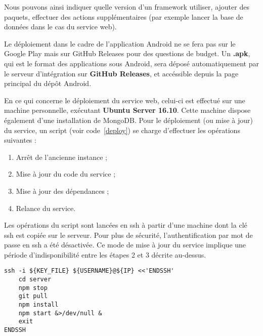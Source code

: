 Nous pouvons ainsi indiquer quelle version d'un framework utiliser, ajouter des paquets, effectuer des actions supplémentaires (par exemple lancer la base de données dans le cas du service web).

Le déploiement dans le cadre de l’application Android ne se fera pas sur le Google Play mais sur GitHub Releases pour des questions de budget. Un \textbf{.apk}, qui est le format des applications sous Android, sera déposé automatiquement par le serveur d’intégration sur \textbf{GitHub Releases}, et accéssible depuis la page principal du dépôt Android.

En ce qui concerne le déploiement du service web, celui-ci est effectué sur une machine personnelle, exécutant \textbf{Ubuntu Server 16.10}. Cette machine dispose également d'une installation de MongoDB. Pour le déploiement (ou mise à jour) du service, un script (voir code~\ref{deploy}) se charge d'effectuer les opérations suivantes :
\begin{enumerate}
    \item Arrêt de l'ancienne instance ;
    \item Mise à jour du code du service ;
    \item Mise à jour des dépendances ;
    \item Relance du service.
\end{enumerate}

Les opérations du script sont lancées en ssh à partir d'une machine dont la clé ssh est copiée sur le serveur. Pour plus de sécurité, l'authentification par mot de passe en ssh a été désactivée. Ce mode de mise à jour du service implique une période d'indisponibilité entre les étapes 2 et 3 décrite au-dessus.

\lstset{language=sh}
\begin{lstlisting}[caption=Script de déploiement du service, label=deploy]
ssh -i ${KEY_FILE} ${USERNAME}@${IP} <<'ENDSSH'
    cd server
    npm stop
    git pull
    npm install
    npm start &>/dev/null &
    exit
ENDSSH
\end{lstlisting}